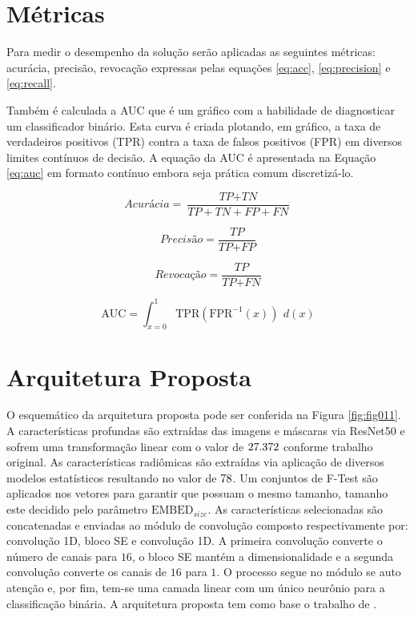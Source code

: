 \section{Métricas}
\label{subsec:cap4_metrics}
Para medir o desempenho da solução serão aplicadas as seguintes métricas: acurácia, precisão, revocação expressas pelas equações \ref{eq:acc}, \ref{eq:precision} e \ref{eq:recall}.

Também é calculada a \gls{AUC} que é um gráfico com a habilidade de diagnosticar um classificador binário. Esta curva é criada plotando, em gráfico, a taxa de verdadeiros positivos (TPR) contra a taxa de falsos positivos (FPR) em diversos limites contínuos de decisão. A equação da \gls{AUC} é apresentada na Equação \ref{eq:auc} em formato contínuo embora seja prática comum discretizá-lo.


\begin{equation}
  \textit{Acurácia} = \frac{\textit{TP} + \textit{TN}}{\textit{TP} + \textit{TN} + \textit{FP} + \textit{FN}}
  \label{eq:acc}
\end{equation}

\begin{equation}
  \textit{Precisão} = \frac{\textit{TP}}{\textit{TP} + \textit{FP}}
  \label{eq:precision}
\end{equation}

\begin{equation}
  \textit{Revocação} = \frac{\textit{TP}}{\textit{TP} + \textit{FN}}
  \label{eq:recall}
\end{equation}

\begin{equation}
  \text{AUC} = \int_{x=0}^{1} \text{TPR}(\text{FPR}^{-1}(x)) \ \, d(x)
  \label{eq:auc}
\end{equation}

\section{Arquitetura Proposta}
\label{subsec:cap4_architecture}

O esquemático da arquitetura proposta pode ser conferida na Figura \ref{fig:fig011}. A características profundas são extraídas das imagens e máscaras via ResNet50 e sofrem uma transformação linear com o valor de $27.372$ conforme trabalho original. As características radiômicas são extraídas via aplicação de diversos modelos estatísticos resultando no valor de $78$. Um conjuntos de F-Test são aplicados nos vetores para garantir que possuam o mesmo tamanho, tamanho este decidido pelo parâmetro $\text{EMBED}_{size}$. As características selecionadas são concatenadas e enviadas ao módulo de convolução composto respectivamente por: convolução 1D, bloco \gls{SE} e convolução 1D. A primeira convolução converte o número de canais para $16$, o bloco \gls{SE} mantém a dimensionalidade e a segunda convolução converte os canais de $16$ para $1$. O processo segue no módulo se auto atenção e, por fim, tem-se uma camada linear com um único neurônio para a classificação binária. A arquitetura proposta tem como base o trabalho de \cite{aiSelfAttentionBasedFusion2023}.

